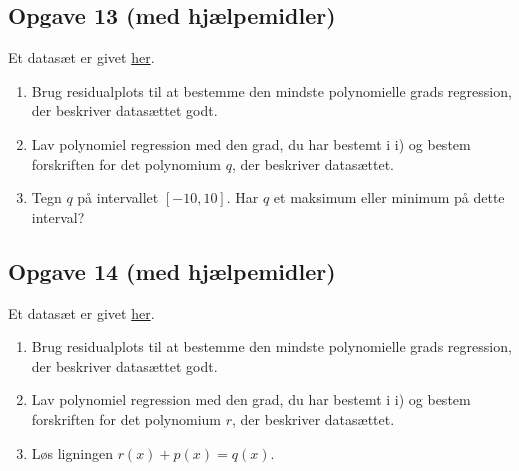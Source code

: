 \subsection*{Opgave 13 (med hjælpemidler)}
	Et datasæt er givet \href{https://github.com/ChristianJLex/TeachingNotes/raw/master/2023-2024/Data og lign/poly_opgave5.xlsx}{\color{blue!60} her}.
	\begin{enumerate}[label=\roman*)]
		\item Brug residualplots til at bestemme den mindste polynomielle grads regression, 
		der beskriver datasættet godt. 
		\item Lav polynomiel regression med den grad, du har bestemt i i) og bestem 
		forskriften for det polynomium $q$, der beskriver datasættet.
		\item Tegn $q$ på intervallet $[-10,10]$. Har $q$ et maksimum eller minimum på dette interval?
	\end{enumerate}

\subsection*{Opgave 14 (med hjælpemidler)}
	Et datasæt er givet \href{https://github.com/ChristianJLex/TeachingNotes/raw/master/2023-2024/Data og lign/poly_opgave6.xlsx}{\color{blue!60} her}.
	\begin{enumerate}[label=\roman*)]
		\item Brug residualplots til at bestemme den mindste polynomielle grads regression, 
		der beskriver datasættet godt. 
		\item Lav polynomiel regression med den grad, du har bestemt i i) og bestem 
		forskriften for det polynomium $r$, der beskriver datasættet.
		\item Løs ligningen $r(x) + p(x) = q(x)$.
	\end{enumerate}

